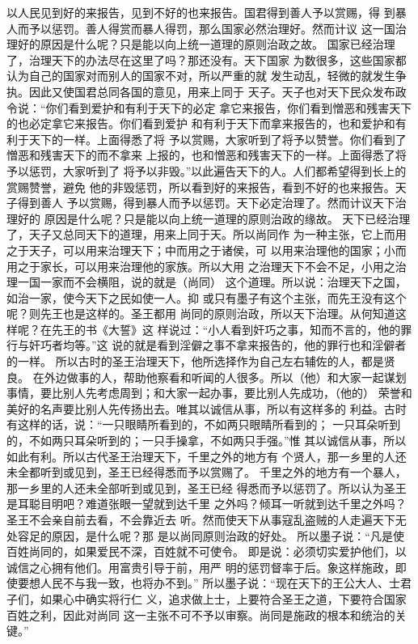 \documentclass[12pt,UTF8]{ctexbook}
\begin{document}
以人民见到好的来报告，见到不好的也来报告。国君得到善人予以赏赐，得 
到暴人而予以惩罚。善人得赏而暴人得罚，那么国家必然治理好。然而计议 
这一国治理好的原因是什么呢？只是能以向上统一道理的原则治政之故。 
国家已经治理了，治理天下的办法尽在这里了吗？那还没有。天下国家 
为数很多，这些国家都认为自己的国家对而别人的国家不对，所以严重的就 
发生动乱，轻微的就发生争执。因此又使国君总同各国的意见，用来上同于 
天子。天子也对天下民众发布政令说：“你们看到爱护和有利于天下的必定 
拿它来报告，你们看到憎恶和残害天下的也必定拿它来报告。你们看到爱护 
和有利于天下而拿来报告的，也和爱护和有利于天下的一样。上面得悉了将 
予以赏赐，大家听到了将予以赞誉。你们看到了憎恶和残害天下的而不拿来 
上报的，也和憎恶和残害天下的一样。上面得悉了将予以惩罚，大家听到了 
将予以非毁。”以此遍告天下的人。人们都希望得到长上的赏赐赞誉，避免 
他的非毁惩罚，所以看到好的来报告，看到不好的也来报告。天子得到善人 
予以赏赐，得到暴人而予以惩罚。天下必定治理了。然而计议天下治理好的 
原因是什么呢？只是能以向上统一道理的原则治政的缘故。 
天下已经治理了，天子又总同天下的道理，用来上同于天。所以尚同作 
为一种主张，它上而用之于天子，可以用来治理天下；中而用之于诸侯，可 
以用来治理他的国家；小而用之于家长，可以用来治理他的家族。所以大用 
之治理天下不会不足，小用之治理一国一家而不会横阻，说的就是（尚同） 
这个道理。所以说：治理天下之国，如治一家，使今天下之民如使一人。抑 
或只有墨子有这个主张，而先王没有这个呢？则先王也是这样的。圣王都用 
尚同的原则治政，所以天下治理。从何知道这样呢？在先王的书《大誓》这 
样说过：“小人看到奸巧之事，知而不言的，他的罪行与奸巧者均等。”这 
说的就是看到淫僻之事不拿来报告的，他的罪行也和淫僻者的一样。 
所以古时的圣王治理天下，他所选择作为自己左右辅佐的人，都是贤良。 
在外边做事的人，帮助他察看和听闻的人很多。所以（他）和大家一起谋划 
事情，要比别人先考虑周到；和大家一起办事，要比别人先成功，（他的） 
荣誉和美好的名声要比别人先传扬出去。唯其以诚信从事，所以有这样多的 
利益。古时有这样的话，说：“一只眼睛所看到的，不如两只眼睛所看到的； 
一只耳朵听到的，不如两只耳朵听到的；一只手操拿，不如两只手强。”惟 
其以诚信从事，所以如此有利。所以古代圣王治理天下，千里之外的地方有 
个贤人，那一乡里的人还未全都听到或见到，圣王已经得悉而予以赏赐了。 
千里之外的地方有一个暴人，那一乡里的人还未全部听到或见到，圣王已经 
得悉而予以惩罚了。所以认为圣王是耳聪目明吧？难道张眼一望就到达千里 
之外吗？倾耳一听就到达千里之外吗？圣王不会亲自前去看，不会靠近去 
听。然而使天下从事寇乱盗贼的人走遍天下无处容足的原因，是什么呢？那 
是以尚同原则治政的好处。 
所以墨子说：“凡是使百姓尚同的，如果爱民不深，百姓就不可使令。 
即是说：必须切实爱护他们，以诚信之心拥有他们。用富贵引导于前，用严 
明的惩罚督率于后。象这样施政，即使要想人民不与我一致，也将办不到。” 
所以墨子说：“现在天下的王公大人、士君子们，如果心中确实将行仁 
义，追求做上士，上要符合圣王之道，下要符合国家百姓之利，因此对尚同 
这一主张不可不予以审察。尚同是施政的根本和统治的关键。” 
\end{document}
